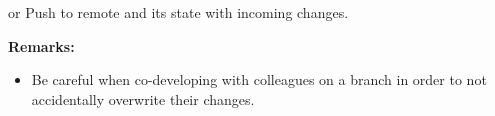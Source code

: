 \begin{frame}
\begin{block}{ or }
Push to remote and  its state with incoming changes.
\end{block}
\textbf{Remarks:}
\begin{itemize}
\item Be careful when co-developing with colleagues on a branch in order to not accidentally overwrite their changes.
\end{itemize}
\end{frame}

%



